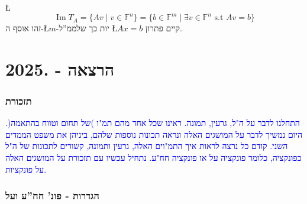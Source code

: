 \documentclass[english,hebrew]{article}
\begin{document}
\L{%
\[
\operatorname{Im}T_{A}=\{Av\mid v\in\mathbb{F}^{n}\}=\{b\in\mathbb{F}^{m}\mid\exists v\in\mathbb{F}^{n}\text{ s.t }Av=b\}
\]
}%
זהו אוסף ה-\L{$m$}-יות כך שלממ\textquotedblright ל \L{$Ax=b$} קיים
פתרון. 

\newpage{}

\noindent{}

\part{הרצאה {\endL} - {.2025\endL}}

\section{תזכורת}

\textcolor{blue}{התחלנו לדבר על ה"ל, גרעין, תמונה. ראינו שכל אחד
מהם תמ"ו )של תחום וטווח בהתאמה(. היום נמשיך לדבר על המושגים האלה
ונראה תכונות נוספות שלהם, ביניהן את משפט הממדים השני. קודם כל נרצה
לראות איך התמ"וים האלה, גרעין ותמונה, קשורים לתכונות של ה"ל כפונקציה,
כלומר פונקציה על או פונקציה חח"ע. נתחיל עכשיו עם תזכורת על המושגים
האלה על פונקציות.}

\section{הגדרות - פונ' חח\textquotedblright ע ועל}
\end{document}
